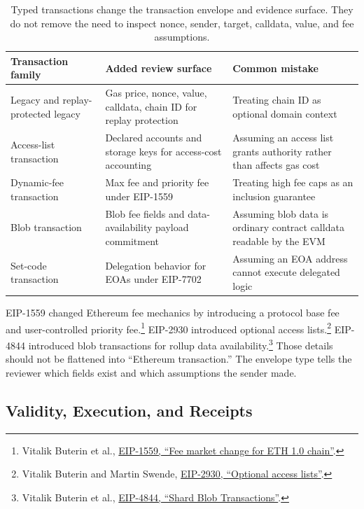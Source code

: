 \begin{table}[htbp]
\centering
\small
\renewcommand{\arraystretch}{1.18}
\begin{tabularx}{\textwidth}{@{}>{\RaggedRight\arraybackslash}p{}>{\RaggedRight\arraybackslash}p{}X@{}}
\toprule
Transaction family & Added review surface & Common mistake \\
\midrule
Legacy and replay-protected legacy & Gas price, nonce, value, calldata, chain ID for replay protection & Treating chain ID as optional domain context \\
Access-list transaction & Declared accounts and storage keys for access-cost accounting & Assuming an access list grants authority rather than affects gas cost \\
Dynamic-fee transaction & Max fee and priority fee under EIP-1559 & Treating high fee caps as an inclusion guarantee \\
Blob transaction & Blob fee fields and data-availability payload commitment & Assuming blob data is ordinary contract calldata readable by the EVM \\
Set-code transaction & Delegation behavior for EOAs under EIP-7702 & Assuming an EOA address cannot execute delegated logic \\
\bottomrule
\end{tabularx}
\caption{Typed transactions change the transaction envelope and evidence surface. They do not remove the need to inspect nonce, sender, target, calldata, value, and fee assumptions.}
\end{table}

EIP-1559 changed Ethereum fee mechanics by introducing a protocol base fee and user-controlled priority fee.\footnote{Vitalik Buterin et al., \href{https://eips.ethereum.org/EIPS/eip-1559}{EIP-1559, ``Fee market change for ETH 1.0 chain''}.} EIP-2930 introduced optional access lists.\footnote{Vitalik Buterin and Martin Swende, \href{https://eips.ethereum.org/EIPS/eip-2930}{EIP-2930, ``Optional access lists''}.} EIP-4844 introduced blob transactions for rollup data availability.\footnote{Vitalik Buterin et al., \href{https://eips.ethereum.org/EIPS/eip-4844}{EIP-4844, ``Shard Blob Transactions''}.} Those details should not be flattened into ``Ethereum transaction.'' The envelope type tells the reviewer which fields exist and which assumptions the sender made.

\subsection{Validity, Execution, and Receipts}

